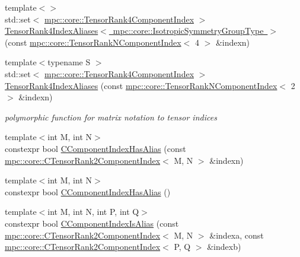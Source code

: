 \begin{DoxyCompactItemize}
\item 
{\footnotesize template$<$$>$ }\\std\+::set$<$ \mbox{\hyperlink{namespacempc_1_1core_a54c081f41b2475abd10182bf023805d2}{mpc\+::core\+::\+Tensor\+Rank4\+Component\+Index}} $>$ \mbox{\hyperlink{namespacempc_1_1core_a843a34f476e1272ca8745eece0697e35}{Tensor\+Rank4\+Index\+Aliases$<$ mpc\+::core\+::\+Isotropic\+Symmetry\+Group\+Type $>$}} (const \mbox{\hyperlink{classmpc_1_1core_1_1_tensor_rank_n_component_index}{mpc\+::core\+::\+Tensor\+Rank\+N\+Component\+Index}}$<$ 4 $>$ \&indexn)
\item 
{\footnotesize template$<$typename S $>$ }\\std\+::set$<$ \mbox{\hyperlink{namespacempc_1_1core_a54c081f41b2475abd10182bf023805d2}{mpc\+::core\+::\+Tensor\+Rank4\+Component\+Index}} $>$ \mbox{\hyperlink{namespacempc_1_1core_ae51c90cf3ec68d7a452bfcefc3405858}{Tensor\+Rank4\+Index\+Aliases}} (const \mbox{\hyperlink{classmpc_1_1core_1_1_tensor_rank_n_component_index}{mpc\+::core\+::\+Tensor\+Rank\+N\+Component\+Index}}$<$ 2 $>$ \&indexn)
\begin{DoxyCompactList}\small\item\em polymorphic function for matrix notation to tensor indices \end{DoxyCompactList}\item 
{\footnotesize template$<$int M, int N$>$ }\\constexpr bool \mbox{\hyperlink{namespacempc_1_1core_a41f80a8b9f9225f1642eeb1673a7390c}{C\+Component\+Index\+Has\+Alias}} (const \mbox{\hyperlink{classmpc_1_1core_1_1_c_tensor_rank2_component_index}{mpc\+::core\+::\+C\+Tensor\+Rank2\+Component\+Index}}$<$ M, N $>$ \&indexn)
\item 
{\footnotesize template$<$int M, int N$>$ }\\constexpr bool \mbox{\hyperlink{namespacempc_1_1core_a9c341d33c82aa89108921c14b7ecf2ee}{C\+Component\+Index\+Has\+Alias}} ()
\item 
{\footnotesize template$<$int M, int N, int P, int Q$>$ }\\constexpr bool \mbox{\hyperlink{namespacempc_1_1core_ad146cbb32d70eee93b789db71d9d5e87}{C\+Component\+Index\+Is\+Alias}} (const \mbox{\hyperlink{classmpc_1_1core_1_1_c_tensor_rank2_component_index}{mpc\+::core\+::\+C\+Tensor\+Rank2\+Component\+Index}}$<$ M, N $>$ \&indexa, const \mbox{\hyperlink{classmpc_1_1core_1_1_c_tensor_rank2_component_index}{mpc\+::core\+::\+C\+Tensor\+Rank2\+Component\+Index}}$<$ P, Q $>$ \&indexb)
\item 

\end{DoxyCompactItemize}
